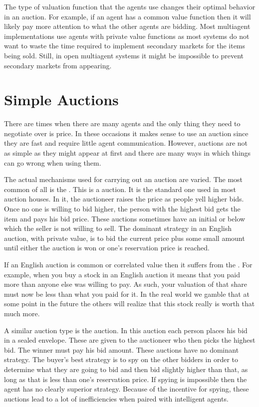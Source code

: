 The type of valuation function that the agents use changes their
optimal behavior in an auction. For example, if an agent has a common
value function then it will likely pay more attention to what the
other agents are bidding. Most multiagent implementations use agents
with private value functions as most systems do not want to waste the
time required to implement secondary markets for the items being sold.
Still, in open multiagent systems it might be impossible to prevent
secondary markets from appearing.


\section{Simple Auctions}

There are times when there are many agents and the only thing they
need to negotiate over is price. In these occasions it makes sense to
use an auction since they are fast and require little agent
communication. However, auctions are not as simple as they might
appear at first and there are many ways in which things can go wrong
when using them.

The actual mechanisms used for carrying out an auction are varied. The
most common of all is the . This is a
 auction.  It is the standard one
used in most auction houses. In it, the auctioneer raises the price as
people yell higher bids. Once no one is willing to bid higher, the
person with the highest bid gets the item and pays his bid price.
These auctions sometimes have an initial or 
below which the seller is not willing to sell. The dominant strategy
in an English auction, with private value, is to bid the current price
plus some small amount until either the auction is won or one's
reservation price is reached.

If an English auction is common or correlated value then it suffers
from the . For example, when you buy a stock in an
English auction it means that you paid more than anyone else was
willing to pay. As such, your valuation of that share must now be less
than what you paid for it. In the real world we gamble that at some
point in the future the others will realize that this stock really is
worth that much more.
\medskip

A similar auction type is the  auction. In
this auction each person places his bid in a sealed envelope. These
are given to the auctioneer who then picks the highest bid. The winner
must pay his bid amount.  These auctions have no dominant strategy.
The buyer's best strategy is to spy on the other bidders in order to
determine what they are going to bid and then bid slightly higher than
that, as long as that is less than one's reservation price. If spying
is impossible then the agent has no clearly superior strategy.
Because of the incentive for spying, these auctions lead to a lot of
inefficiencies when paired with intelligent agents.

